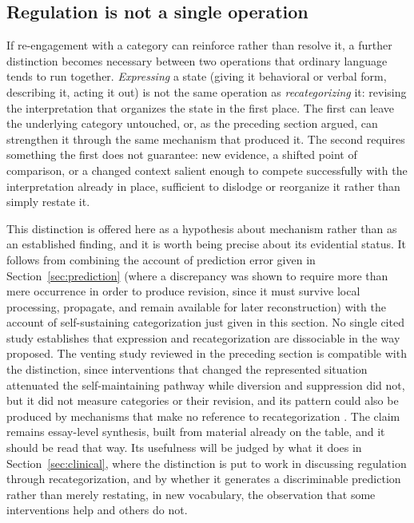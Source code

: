 \documentclass[11pt]{article}
\begin{document}
\subsection{Regulation is not a single operation}\label{sub:expression}

If re-engagement with a category can reinforce rather than resolve it, a further distinction becomes necessary between two operations that ordinary language tends to run together. \emph{Expressing} a state (giving it behavioral or verbal form, describing it, acting it out) is not the same operation as \emph{recategorizing} it: revising the interpretation that organizes the state in the first place. The first can leave the underlying category untouched, or, as the preceding section argued, can strengthen it through the same mechanism that produced it. The second requires something the first does not guarantee: new evidence, a shifted point of comparison, or a changed context salient enough to compete successfully with the interpretation already in place, sufficient to dislodge or reorganize it rather than simply restate it.

This distinction is offered here as a hypothesis about mechanism rather than as an established finding, and it is worth being precise about its evidential status. It follows from combining the account of prediction error given in Section~\ref{sec:prediction} (where a discrepancy was shown to require more than mere occurrence in order to produce revision, since it must survive local processing, propagate, and remain available for later reconstruction) with the account of self-sustaining categorization just given in this section. No single cited study establishes that expression and recategorization are dissociable in the way proposed. The venting study reviewed in the preceding section is compatible with the distinction, since interventions that changed the represented situation attenuated the self-maintaining pathway while diversion and suppression did not, but it did not measure categories or their revision, and its pattern could also be produced by mechanisms that make no reference to recategorization \citep{Zhang2026}. The claim remains essay-level synthesis, built from material already on the table, and it should be read that way. Its usefulness will be judged by what it does in Section~\ref{sec:clinical}, where the distinction is put to work in discussing regulation through recategorization, and by whether it generates a discriminable prediction rather than merely restating, in new vocabulary, the observation that some interventions help and others do not.
\end{document}
